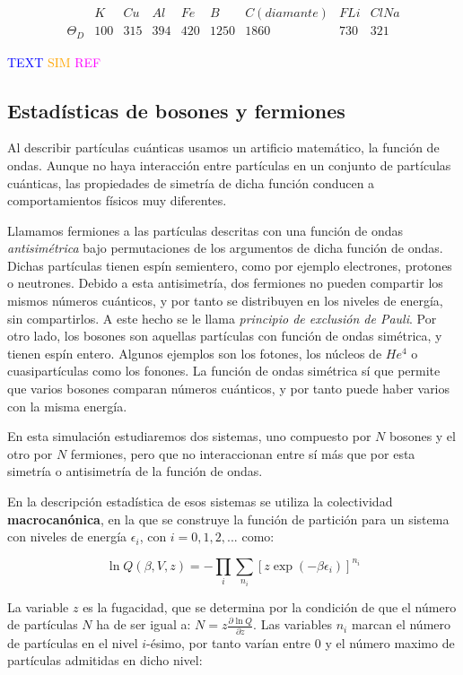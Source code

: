 \documentclass[11pt, a4paper]{article} %
\theoremstyle{named}
\begin{document}
$$
\begin{array}{c|cccccccc}
 &K &	Cu &	Al &	Fe &	B &	C(diamante) &	FLi &	ClNa \\ \hline
\Theta_D & 100 & 315 &	394 &	420 &	1250 &	1860 &	730 &	321
\end{array}
$$

\textcolor{blue}{TEXT}
\textcolor{orange}{SIM}
\textcolor{magenta}{REF}

\subsection{Estadísticas de bosones y fermiones}\label{sec:bosefermi}

Al describir partículas cuánticas usamos un artificio matemático, la función de ondas. Aunque no haya interacción entre partículas en un conjunto de partículas cuánticas, las propiedades de simetría de dicha función conducen a comportamientos físicos muy diferentes.

Llamamos fermiones a las partículas descritas con una función de ondas \textit{antisimétrica} bajo permutaciones de los argumentos de dicha función de ondas. Dichas partículas tienen espín semientero, como por ejemplo electrones, protones o neutrones. Debido a esta antisimetría, dos fermiones no pueden compartir los mismos números cuánticos, y por tanto se distribuyen en los niveles de energía, sin compartirlos. A este hecho se le llama \textit{principio de exclusión de Pauli}. Por otro lado, los bosones son aquellas partículas con función de ondas simétrica, y tienen espín entero. Algunos  ejemplos son los fotones, los núcleos de $He^4$ o cuasipartículas como los fonones. La función de ondas simétrica sí que permite que varios bosones comparan números cuánticos, y por tanto puede haber varios con la misma energía.

En esta simulación estudiaremos dos sistemas, uno compuesto por $N$ bosones y el otro por $N$ fermiones, pero que no interaccionan entre sí más que por esta simetría o antisimetría de la función de ondas.

En la descripción estadística de esos sistemas se utiliza la colectividad \textbf{macrocanónica}, en la que se construye la función de partición para un sistema con niveles de energía $\epsilon_i$, con $i=0,1,2,...$ como:

$$
\ln Q(\beta,V,z) = -\prod_i \sum_{n_i}[z \exp (-\beta \epsilon_i)]^{n_i}
$$

La variable $z$ es la fugacidad, que se determina por la condición de que el número de partículas $N$ ha de ser igual a: $N=z \frac{\partial \ln Q}{\partial z}$. Las variables $n_i$ marcan el número de partículas en el nivel $i$-ésimo, por tanto varían entre $0$ y el número maximo de partículas admitidas en dicho nivel:
\end{document}
